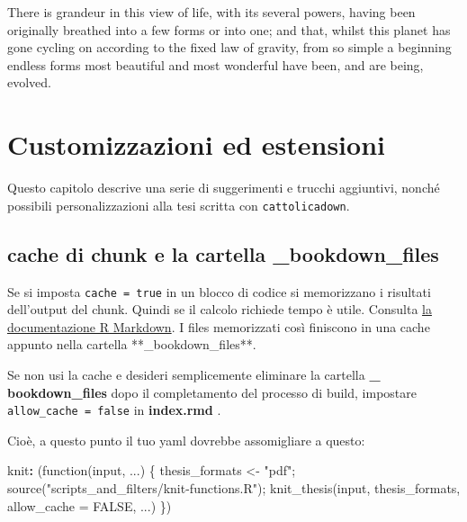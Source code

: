\documentclass[a4paper, 11pt, nobind]{templates/ociamthesis}
\newenvironment{Shaded}{\begin{snugshade}}{\end{snugshade}}
\newcommand{\AttributeTok}[1]{\textcolor[rgb]{0.77,0.63,0.00}{#1}}
\newcommand{\FunctionTok}[1]{\textcolor[rgb]{0.00,0.00,0.00}{#1}}
\newcommand{\KeywordTok}[1]{\textcolor[rgb]{0.13,0.29,0.53}{\textbf{#1}}}
\renewenvironment{Shaded}
{
  \vspace{10pt}%
  \begin{snugshade}%
}{%
  \end{snugshade}%
  \vspace{8pt}%
}
\begin{document}
\begin{savequote}
There is grandeur in this view of life, with its several powers, having
been originally breathed into a few forms or into one; and that, whilst
this planet has gone cycling on according to the fixed law of gravity,
from so simple a beginning endless forms most beautiful and most
wonderful have been, and are being, evolved.
\end{savequote}



\hypertarget{customizzazioni-ed-estensioni}{%
\chapter{Customizzazioni ed estensioni}\label{customizzazioni-ed-estensioni}}

\minitoc 

\noindent Questo capitolo descrive una serie di suggerimenti e trucchi aggiuntivi, nonché possibili personalizzazioni alla tesi scritta con \texttt{cattolicadown}.

\hypertarget{cache-di-chunk-e-la-cartella-_bookdown_files}{%
\section{\texorpdfstring{cache di chunk e la cartella \textbf{\_bookdown\_files}}{cache di chunk e la cartella \_bookdown\_files}}\label{cache-di-chunk-e-la-cartella-_bookdown_files}}

Se si imposta \texttt{cache\ =\ true} in un blocco di codice si memorizzano i risultati dell'output del chunk. Quindi se il calcolo richiede tempo è utile. Consulta \href{https://bookdown.org/yihui/rmarkdown-cookbook/cache.\%20HTML}{la documentazione R Markdown}. I files memorizzati così finiscono in una cache appunto nella cartella **\_bookdown\_files**.

Se non usi la cache e desideri semplicemente eliminare la cartella \textbf{\_ bookdown\_files } dopo il completamento del processo di build, impostare \texttt{allow\_cache\ =\ false} in \textbf{index.rmd }.

Cioè, a questo punto il tuo yaml dovrebbe assomigliare a questo:

\begin{Shaded}
\begin{Highlighting}[]
\FunctionTok{knit}\KeywordTok{:}\AttributeTok{ (function(input, ...) \{}
\AttributeTok{    thesis\_formats \textless{}{-} "pdf";}
\AttributeTok{    }
\AttributeTok{    source("scripts\_and\_filters/knit{-}functions.R");}
\AttributeTok{    knit\_thesis(input, thesis\_formats, allow\_cache = FALSE, ...)}
\AttributeTok{  \})}
\end{Highlighting}
\end{Shaded}
\end{document}
